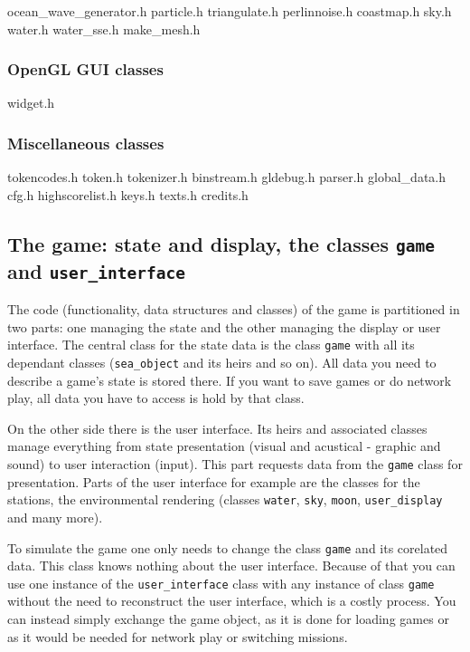 \documentclass{report}
\begin{document}
ocean_wave_generator.h particle.h triangulate.h perlinnoise.h coastmap.h
sky.h water.h water_sse.h make_mesh.h

\subsubsection{OpenGL GUI classes}

widget.h

\subsubsection{Miscellaneous classes}

tokencodes.h token.h tokenizer.h binstream.h gldebug.h parser.h
global_data.h cfg.h highscorelist.h keys.h texts.h credits.h




\subsection{The game: state and display, the classes \texttt{game} and
  \texttt{user\_interface}}

The code (functionality, data structures and classes) of the game is
partitioned in two parts: one managing the state and the other managing
the display or user interface. The central class for the state data is
the class \texttt{game} with all its dependant classes
(\texttt{sea\_object} and its heirs and so on). All data you need to
describe a game's state is stored there. If you want to save games or do
network play, all data you have to access is hold by that class.

On the other side there is the user interface. Its heirs and associated
classes manage everything from state presentation (visual and acustical
- graphic and sound) to user interaction (input). This part requests
data from the \texttt{game} class for presentation. Parts of the user
interface for example are the classes for the stations, the
environmental rendering (classes \texttt{water}, \texttt{sky},
\texttt{moon}, \texttt{user\_display} and many more).

To simulate the game one only needs to change the class \texttt{game}
and its corelated data. This class knows nothing about the user
interface. Because of that you can use one instance of the
\texttt{user\_interface} class with any instance of class \texttt{game}
without the need to reconstruct the user interface, which is a costly
process. You can instead simply exchange the game object, as it is done
for loading games or as it would be needed for network play or switching
missions.
\end{document}
